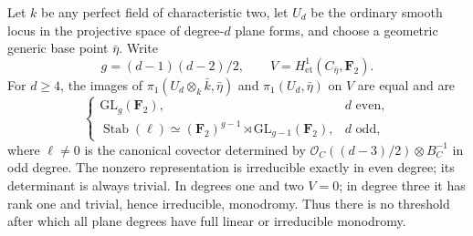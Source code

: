 \begin{theorem}
\label{thm:plane-char2-all-groups}
Let $k$ be any perfect field of characteristic two, let $U_d$ be
the ordinary smooth locus in the projective space of degree-$d$
plane forms, and choose a geometric generic base point $\bar\eta$.
Write
\[
 g=(d-1)(d-2)/2,\qquad
 V=H^1_{\mathrm{et}}(C_{\bar\eta},\mathbf F_2).
\]
For $d\ge4$, the images of $\pi_1(U_d\otimes_k\bar k,\bar\eta)$
and $\pi_1(U_d,\bar\eta)$ on $V$ are equal and are
\[
 \begin{cases}
 \mathrm{GL}_g(\mathbf F_2),&d\text{ even},\\
 \operatorname{Stab}(\ell)
   \simeq(\mathbf F_2)^{g-1}\rtimes
                  \mathrm{GL}_{g-1}(\mathbf F_2),&d\text{ odd},
 \end{cases}
\]
where $\ell\ne0$ is the canonical covector determined by
$\mathcal O_C((d-3)/2)\otimes B_C^{-1}$ in odd degree.
The nonzero representation is irreducible exactly in even degree;
its determinant is always trivial. In degrees one and two $V=0$;
in degree three it has rank one and trivial, hence irreducible,
monodromy. Thus there is no threshold after which all plane
degrees have full linear or irreducible monodromy.
\end{theorem}
